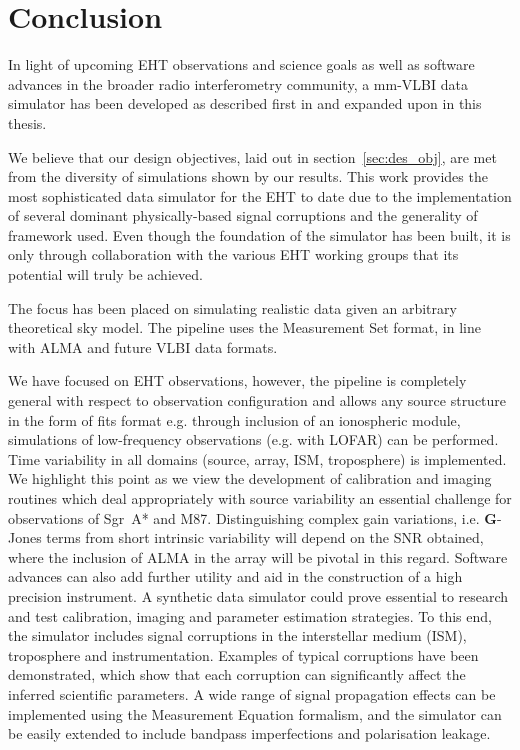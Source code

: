 \chapter{Conclusion} %

In light of upcoming EHT observations and science goals as well as software advances in the broader radio interferometry community, a mm-VLBI data simulator has been developed as described first in \citet{Blecher_2016} and expanded upon in this thesis.

We believe that our design objectives, laid out in section~\ref{sec:des_obj}, are met from the diversity of simulations shown by our results. This work provides the most sophisticated data simulator for the EHT to date due to the implementation of several dominant physically-based signal corruptions and the generality of framework used. Even though the foundation of the simulator has been built, it is only through collaboration with the various EHT working groups that its potential will truly be achieved.


The focus has been placed on simulating realistic data given an arbitrary theoretical sky model. The pipeline uses the {\sc Measurement Set} format, in line with ALMA and future VLBI data formats.


We have focused on EHT observations, however, the pipeline is completely general with respect to observation configuration and allows any source structure in the form of {\sc fits} format e.g. through inclusion of an ionospheric module, simulations of low-frequency observations (e.g. with LOFAR) can be performed. 
Time variability in all domains (source, array, ISM, troposphere) is implemented. We highlight this point as we view the development of calibration and imaging routines which deal appropriately with source variability an essential challenge for observations of Sgr~A* and M87. Distinguishing complex gain variations, i.e. $\bm G$-Jones terms from short intrinsic variability will depend on the SNR obtained, where the inclusion of ALMA in the array will be pivotal in this regard. Software advances can also add further utility and aid in the construction of a high precision instrument. A synthetic data simulator could prove essential to research and test calibration, imaging and parameter estimation strategies.
To this end, the simulator includes signal corruptions in the interstellar medium (ISM), troposphere and instrumentation. Examples of typical corruptions have been demonstrated, which show that each corruption can significantly affect the inferred scientific parameters. A wide range of signal propagation effects can be implemented using the Measurement Equation formalism, and the simulator can be easily extended to include bandpass imperfections and polarisation leakage.


